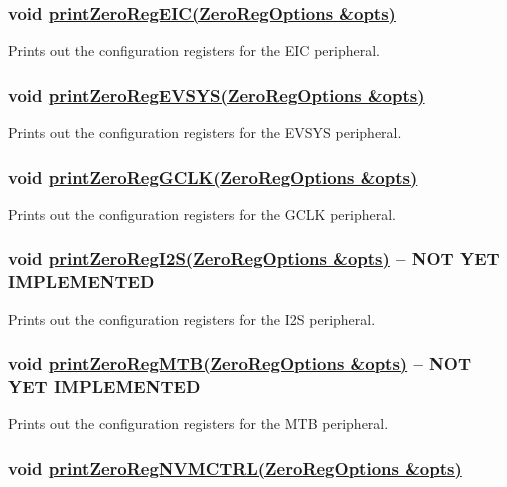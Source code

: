 \subsubsection*{void \hyperlink{_zero_regs_8h_ac587593ee2a9ae02c2cfc677fe773c28}{print\+Zero\+Reg\+E\+I\+C(\+Zero\+Reg\+Options \&opts)}}

Prints out the configuration registers for the {\ttfamily E\+IC} peripheral.

\subsubsection*{void \hyperlink{_zero_regs_8h_aab346cdb76613ed12e521b2e3ab8e585}{print\+Zero\+Reg\+E\+V\+S\+Y\+S(\+Zero\+Reg\+Options \&opts)}}

Prints out the configuration registers for the {\ttfamily E\+V\+S\+YS} peripheral.

\subsubsection*{void \hyperlink{_zero_regs_8h_a4f780af586626841f0bfd07761caae27}{print\+Zero\+Reg\+G\+C\+L\+K(\+Zero\+Reg\+Options \&opts)}}

Prints out the configuration registers for the {\ttfamily G\+C\+LK} peripheral.

\subsubsection*{void \hyperlink{_zero_regs_8h_ad986e6312220f31739dbe2c5e4c9326d}{print\+Zero\+Reg\+I2\+S(\+Zero\+Reg\+Options \&opts)} -- {\bfseries N\+OT Y\+ET I\+M\+P\+L\+E\+M\+E\+N\+T\+ED}}

Prints out the configuration registers for the {\ttfamily I2S} peripheral.

\subsubsection*{void \hyperlink{_zero_regs_8h_aaac9e29b52fd1df890dfa14c2f502420}{print\+Zero\+Reg\+M\+T\+B(\+Zero\+Reg\+Options \&opts)} -- {\bfseries N\+OT Y\+ET I\+M\+P\+L\+E\+M\+E\+N\+T\+ED}}

Prints out the configuration registers for the {\ttfamily M\+TB} peripheral.

\subsubsection*{void \hyperlink{_zero_regs_8h_a6db7f49d374fa825b83040a5acaf04b2}{print\+Zero\+Reg\+N\+V\+M\+C\+T\+R\+L(\+Zero\+Reg\+Options \&opts)}}

